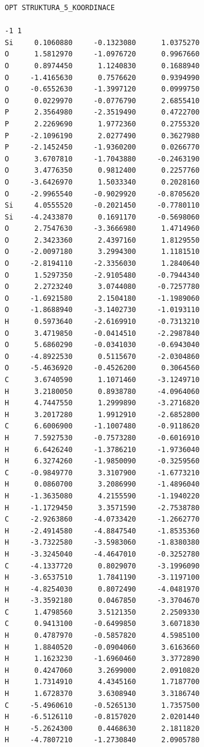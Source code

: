 \documentclass[
digital, %
table,   %
lof,     %
lot,     %
oneside,
]{fithesis3}
\begin{document}
\begin{lstlisting}[frame=single, caption={struktura koordinace 5},label=DescriptiveLabel]
OPT STRUKTURA_5_KOORDINACE

-1 1
Si     0.1060880     -0.1323080      1.0375270
O      1.5812970     -1.0976720      0.9967660
O      0.8974450      1.1240830      0.1688940
O     -1.4165630      0.7576620      0.9394990
O     -0.6552630     -1.3997120      0.0999750
O      0.0229970     -0.0776790      2.6855410
P      2.3564980     -2.3519490      0.4722700
P      2.2269690      1.9772360      0.2755320
P     -2.1096190      2.0277490      0.3627980
P     -2.1452450     -1.9360200      0.0266770
O      3.6707810     -1.7043880     -0.2463190
O      3.4776350      0.9812400      0.2257760
O     -3.6426970      1.5033340      0.2028160
O     -2.9965540     -0.9029920     -0.8705620
Si     4.0555520     -0.2021450     -0.7780110
Si    -4.2433870      0.1691170     -0.5698060
O      2.7547630     -3.3666980      1.4714960
O      2.3423360      2.4397160      1.8129550
O     -2.0097180      3.2994300      1.1181510
O     -2.8194110     -2.3356030      1.2840640
O      1.5297350     -2.9105480     -0.7944340
O      2.2723240      3.0744080     -0.7257780
O     -1.6921580      2.1504180     -1.1989060
O     -1.8688940     -3.1402730     -1.0193110
H      0.5973640     -2.6169910     -0.7313210
O      3.4719850     -0.0414510     -2.2987840
O      5.6860290     -0.0341030     -0.6943040
O     -4.8922530      0.5115670     -2.0304860
O     -5.4636920     -0.4526200      0.3064560
C      3.6740590      1.1071460     -3.1249710
H      3.2180050      0.8938780     -4.0964060
H      4.7447550      1.2999890     -3.2716820
H      3.2017280      1.9912910     -2.6852800
C      6.6006900     -1.1007480     -0.9118620
H      7.5927530     -0.7573280     -0.6016910
H      6.6426240     -1.3786210     -1.9736040
H      6.3274260     -1.9850090     -0.3259560
C     -0.9849770      3.3107900     -1.6773210
H      0.0860700      3.2086990     -1.4896040
H     -1.3635080      4.2155590     -1.1940220
H     -1.1729450      3.3571590     -2.7538780
C     -2.9263860     -4.0733420     -1.2662770
H     -2.4914580     -4.8847540     -1.8535360
H     -3.7322580     -3.5983060     -1.8380380
H     -3.3245040     -4.4647010     -0.3252780
C     -4.1337720      0.8029070     -3.1996090
H     -3.6537510      1.7841190     -3.1197100
H     -4.8254030      0.8072490     -4.0481970
H     -3.3592180      0.0467850     -3.3704670
C      1.4798560      3.5121350      2.2509330
C      0.9413100     -0.6499850      3.6071830
H      0.4787970     -0.5857820      4.5985100
H      1.8840520     -0.0904060      3.6163660
H      1.1623230     -1.6960460      3.3772890
H      0.4247060      3.2699000      2.0910820
H      1.7314910      4.4345160      1.7187700
H      1.6728370      3.6308940      3.3186740
C     -5.4960610     -0.5265130      1.7357500
H     -6.5126110     -0.8157020      2.0201440
H     -5.2624300      0.4468630      2.1811820
H     -4.7807210     -1.2730840      2.0905780

\end{lstlisting}
\end{document}
